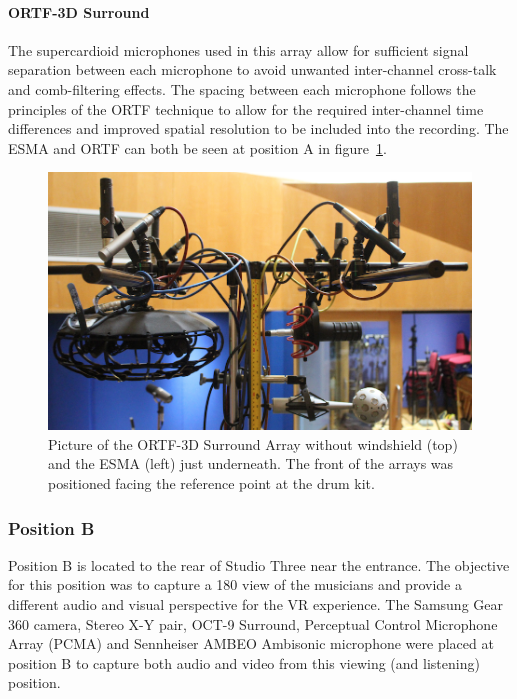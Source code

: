 			\paragraph{ORTF-3D Surround}
			The supercardioid microphones used in this array allow for sufficient signal separation between each microphone to avoid unwanted inter-channel cross-talk and comb-filtering effects. The spacing between each microphone follows the principles of the ORTF technique to allow for the required inter-channel time differences and improved spatial resolution to be included into the recording. The ESMA and ORTF can both be seen at position A in figure~\ref{esma}.\\


			\begin{figure}[h]
			\begin{center}
				\includegraphics[width = \linewidth]{images/other/esmapic.PNG}
				\caption{Picture of the ORTF-3D Surround Array without windshield (top) and the ESMA (left) just underneath. The front of the arrays was positioned facing the reference point at the drum kit.}
				\label{esma}
			\end{center}
			\end{figure}

		\subsubsection{Position B}
			Position B is located to the rear of Studio Three near the entrance. The objective for this position was to capture a 180\textdegree{} view of the musicians and provide a different audio and visual perspective for the VR experience. The Samsung Gear 360 camera, Stereo X-Y pair, OCT-9 Surround, Perceptual Control Microphone Array (PCMA) and Sennheiser AMBEO Ambisonic microphone were placed at position B to capture both audio and video from this viewing (and listening) position.\\

